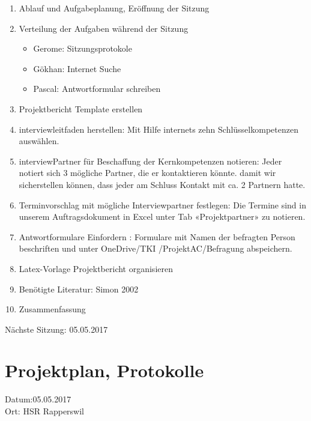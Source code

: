 \begin{enumerate}

\item Ablauf und Aufgabeplanung, Eröffnung der Sitzung 

\item  Verteilung der Aufgaben während der Sitzung
\begin{itemize}
\item Gerome: Sitzungsprotokole
\item Gökhan: Internet Suche
\item Pascal: Antwortformular schreiben
\end{itemize}

\item	Projektbericht Template erstellen

\item  interviewleitfaden herstellen:  Mit Hilfe internets zehn Schlüsselkompetenzen auswählen.

\item 	interviewPartner für Beschaffung der Kernkompetenzen notieren: Jeder notiert sich 3 mögliche Partner, die er kontaktieren könnte. damit wir   sicherstellen können, dass jeder am Schluss Kontakt mit ca. 2 Partnern hatte.

\item 	Terminvorschlag mit mögliche Interviewpartner festlegen:  Die Termine sind in unserem Auftragsdokument in Excel unter Tab «Projektpartner» zu notieren.

\item	Antwortformulare Einfordern : Formulare mit Namen der befragten Person beschriften und unter OneDrive/TKI /ProjektAC/Befragung abspeichern.


\item Latex-Vorlage Projektbericht organisieren

\item Benötigte Literatur: Simon 2002   \cite{simon2002entwicklung}

\item Zusammenfassung

\end{enumerate}

Nächste Sitzung: 05.05.2017

\newpage
\section*{Projektplan, Protokolle}

Datum:05.05.2017\\
Ort: HSR Rapperswil

